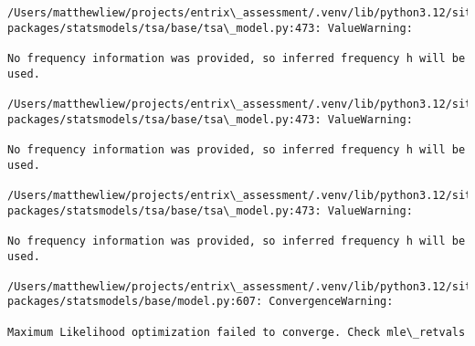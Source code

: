 \documentclass[11pt]{article}
\begin{document}
    \begin{Verbatim}[commandchars=\\\{\}]
/Users/matthewliew/projects/entrix\_assessment/.venv/lib/python3.12/site-
packages/statsmodels/tsa/base/tsa\_model.py:473: ValueWarning:

No frequency information was provided, so inferred frequency h will be used.

/Users/matthewliew/projects/entrix\_assessment/.venv/lib/python3.12/site-
packages/statsmodels/tsa/base/tsa\_model.py:473: ValueWarning:

No frequency information was provided, so inferred frequency h will be used.

/Users/matthewliew/projects/entrix\_assessment/.venv/lib/python3.12/site-
packages/statsmodels/tsa/base/tsa\_model.py:473: ValueWarning:

No frequency information was provided, so inferred frequency h will be used.

/Users/matthewliew/projects/entrix\_assessment/.venv/lib/python3.12/site-
packages/statsmodels/base/model.py:607: ConvergenceWarning:

Maximum Likelihood optimization failed to converge. Check mle\_retvals

    \end{Verbatim}
\end{document}
